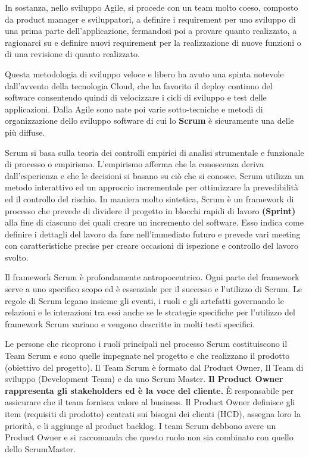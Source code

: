 In sostanza, nello sviluppo Agile, si procede con un team molto coeso, composto da product manager e sviluppatori, a definire i requirement per uno sviluppo di una prima parte dell’applicazione, fermandosi poi a provare quanto realizzato, a ragionarci su e definire nuovi requirement per la realizzazione di nuove funzioni o di una revisione di quanto realizzato.

Questa metodologia di sviluppo veloce e libero ha avuto una spinta notevole dall’avvento della tecnologia Cloud, che ha favorito il deploy continuo del software consentendo quindi di velocizzare i cicli di sviluppo e test delle applicazioni.
Dalla Agile sono nate poi varie sotto-tecniche e metodi di organizzazione dello sviluppo software di cui lo \textbf{Scrum} è sicuramente una delle più diffuse. 

Scrum si basa sulla teoria dei controlli empirici di analisi strumentale e funzionale di processo o empirismo. L'empirismo afferma che la conoscenza deriva dall'esperienza e che le decisioni si basano su ciò che si conosce. Scrum utilizza un metodo interattivo ed un approccio incrementale per ottimizzare la prevedibilità ed il controllo del rischio.
In maniera molto sintetica, Scrum è un framework di processo che prevede di dividere il progetto in blocchi rapidi di lavoro \textbf{(Sprint)} alla fine di ciascuno dei quali creare un incremento del software. Esso indica come definire i dettagli del lavoro da fare nell'immediato futuro e prevede vari meeting con caratteristiche precise per creare occasioni di ispezione e controllo del lavoro svolto.

Il framework Scrum è profondamente antropocentrico. Ogni parte del framework serve a uno specifico scopo ed è essenziale per il successo e l'utilizzo di Scrum. Le regole di Scrum legano insieme gli eventi, i ruoli e gli artefatti governando le relazioni e le interazioni tra essi anche se le strategie specifiche per l'utilizzo del framework Scrum variano e vengono descritte in molti testi specifici.

Le persone che ricoprono i ruoli principali nel processo Scrum costituiscono il Team Scrum e sono quelle impegnate nel progetto e che realizzano il prodotto (obiettivo del progetto). Il Team Scrum è formato dal Product Owner, Il Team di sviluppo (Development Team) e da uno Scrum Master. \textbf{Il Product Owner rappresenta gli stakeholders ed è la voce del cliente.} È responsabile per assicurare che il team fornisca valore al business. Il Product Owner definisce gli item (requisiti di prodotto) centrati sui bisogni dei clienti (HCD), assegna loro la priorità, e li aggiunge al product backlog. I team Scrum debbono avere un Product Owner e si raccomanda che questo ruolo non sia combinato con quello dello ScrumMaster.

